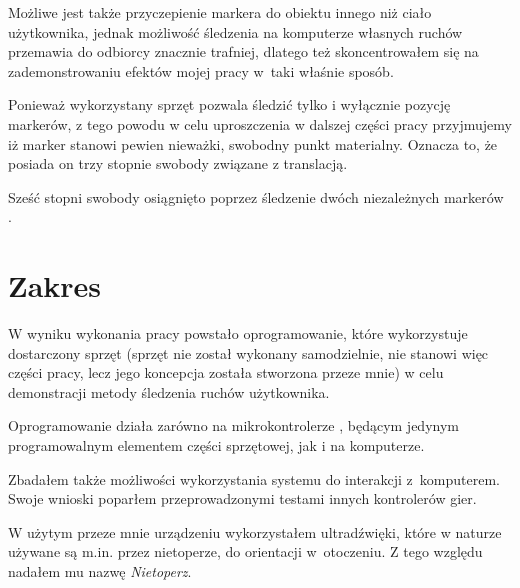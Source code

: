 Możliwe jest także przyczepienie markera do obiektu innego niż ciało użytkownika, jednak możliwość śledzenia na komputerze własnych ruchów przemawia do odbiorcy znacznie trafniej, dlatego też skoncentrowałem się na zademonstrowaniu efektów mojej pracy w~taki właśnie sposób.

Ponieważ wykorzystany sprzęt pozwala śledzić tylko i wyłącznie pozycję markerów, z tego powodu w celu uproszczenia w dalszej części pracy przyjmujemy iż marker stanowi pewien nieważki, swobodny punkt materialny. Oznacza to, że posiada on trzy stopnie swobody związane z translacją.

Sześć stopni swobody osiągnięto poprzez śledzenie dwóch niezależnych markerów \citep{WrZa76}.

\section{Zakres}
W wyniku wykonania pracy powstało oprogramowanie, które wykorzystuje dostarczony sprzęt (sprzęt nie został wykonany samodzielnie, nie stanowi więc części pracy, lecz jego koncepcja została stworzona przeze mnie) w celu demonstracji metody śledzenia ruchów użytkownika.

Oprogramowanie działa zarówno na mikrokontrolerze , będącym jedynym programowalnym elementem części sprzętowej, jak i na komputerze.

Zbadałem także możliwości wykorzystania systemu do interakcji z~komputerem. Swoje wnioski poparłem przeprowadzonymi testami innych kontrolerów gier.

W użytym przeze mnie urządzeniu wykorzystałem ultradźwięki, które w naturze używane są m.in. przez nietoperze, do orientacji w~otoczeniu. Z tego względu nadałem mu nazwę \textsl{Nietoperz}.

